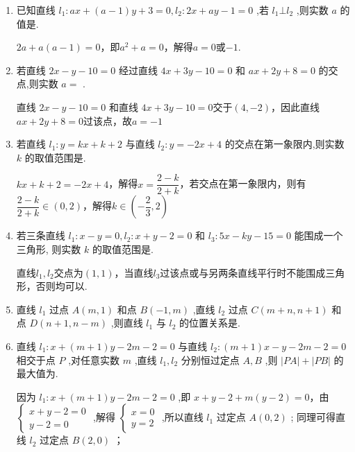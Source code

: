 \begin{enumerate}
    \item 已知直线 ${l}_{1} : {ax} + \left( {a - 1}\right) y + 3 = 0,{l}_{2} : {2x} + {ay} - 1 = 0$ ,若 ${l}_{1} \bot  {l}_{2}$ ,则实数 $a$ 的值是.
    \begin{jieda}
        $2a+a(a-1) = 0$，即$a^2+a = 0$，解得$a = 0$或$-1$.
    \end{jieda}
    
    \item 若直线 ${2x} - y - {10} = 0$ 经过直线 ${4x} + {3y} - {10} = 0$ 和 ${ax} + {2y} + 8 = 0$ 的交点,则实数 $a =$ .
    \begin{jieda}
        直线 ${2x} - y - {10} = 0$ 和直线 ${4x} + {3y} - {10} = 0$交于$(4, -2)$，因此直线${ax} + {2y} + 8 = 0$过该点，故$a = -1$
    \end{jieda}
    
    \item 若直线 ${l}_{1} : y = {kx} + k + 2$ 与直线 ${l}_{2} : y =  - {2x} + 4$ 的交点在第一象限内,则实数 $k$ 的取值范围是.
    \begin{jieda}
        ${kx} + k + 2 =  - {2x} + 4$，解得$x = \dfrac{2-k}{2+k}$，若交点在第一象限内，则有$\dfrac{2-k}{2+k} \in (0, 2)$，解得$k \in \left(-\dfrac{2}{3}, 2\right)$
    \end{jieda}
    
    \item 若三条直线 ${l}_{1} : x - y = 0,{l}_{2} : x + y - 2 = 0$ 和 ${l}_{3} : {5x} - {ky} - {15} = 0$ 能围成一个三角形, 则实数 $k$ 的取值范围是.
    \begin{jieda}
        直线$l_1, l_2$交点为$(1, 1)$，当直线$l_3$过该点或与另两条直线平行时不能围成三角形，否则均可以.
    \end{jieda}
    
    \item 直线 ${l}_{1}$ 过点 $A\left( {m,1}\right)$ 和点 $B\left( {-1,m}\right)$ ,直线 ${l}_{2}$ 过点 $C\left( {m + n,n + 1}\right)$ 和点 $D\left( {n + 1,n - m}\right)$ ,则直线 ${l}_{1}$ 与 ${l}_{2}$ 的位置关系是.

    \item 直线 ${l}_{1} : x + \left( {m + 1}\right) y - {2m} - 2 = 0$ 与直线 ${l}_{2} : \left( {m + 1}\right) x - y - {2m} - 2 = 0$ 相交于点 $P$ ,对任意实数 $m$ ,直线 ${l}_{1},{l}_{2}$ 分别恒过定点 $A,B$ ,则 $\left| {PA}\right|  + \left| {PB}\right|$ 的最大值为.
    \begin{jieda}
        因为 ${l}_{1} : x + \left( {m + 1}\right) y - {2m} - 2 = 0$ ,即 $x + y - 2 + m\left( {y - 2}\right)  = 0$，由 $\left\{  \begin{array}{l} x + y - 2 = 0 \\  y - 2 = 0 \end{array}\right.$ ,解得 $\left\{  \begin{array}{l} x = 0 \\  y = 2 \end{array}\right.$ ,所以直线 ${l}_{1}$ 过定点 $A\left( {0,2}\right)$ ;
        同理可得直线 ${l}_{2}$ 过定点 $B\left( {2,0}\right)$ ；
        

\end{jieda}
\end{enumerate}
